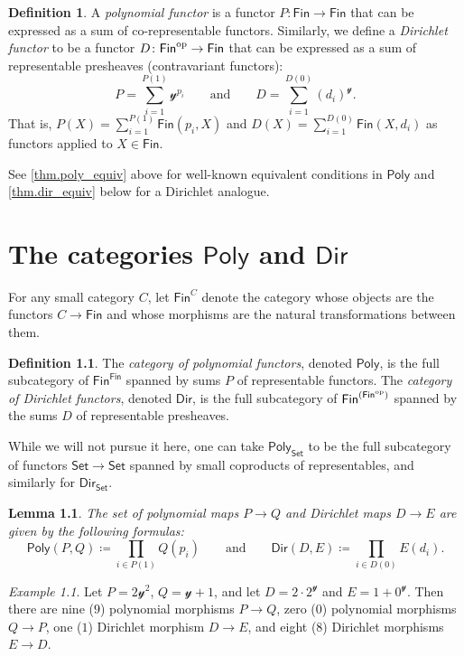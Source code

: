 \documentclass[11pt, article, one side]{memoir}
\theoremstyle{theorem}
\newtheorem{lemma}[section]{Lemma}
\theoremstyle{definition}
\newtheorem{definition}[section]{Definition}
\theoremstyle{remark}
\newtheorem{example}[section]{Example}
\newcommand{\Cat}[1]{\mathsf{#1}}%
\newcommand{\op}{^\tn{op}}
\newcommand{\tn}[1]{\textnormal{#1}}
\newcommand{\smset}{\Cat{Set}}
\newcommand{\fin}{\Cat{Fin}}
\newcommand{\yon}{\mathcal{y}}
\newcommand{\poly}{\Cat{Poly}}
\newcommand{\dir}{\Cat{Dir}}
\newcommand{\qqand}{\qquad\text{and}\qquad}
\begin{document}
\begin{definition}\label{def.poly_dir_obs}
A \emph{polynomial functor} is a functor $P\colon\fin\to\fin$ that can be expressed as a sum of co-representable functors. Similarly, we define a \emph{Dirichlet functor} to be a functor $D\colon\fin\op\to\fin$ that can be expressed as a sum of representable presheaves (contravariant functors):
\begin{equation}\label{eqn.finite_sum}
  P=\sum_{i=1}^{P(1)}\yon^{p_i}
  \qqand
  D=\sum_{i=1}^{D(0)}(d_i)^\yon.
\end{equation}
That is, $P(X)=\sum_{i=1}^{P(1)}\fin(p_i,X)$ and $D(X)=\sum_{i=1}^{D(0)}\fin(X,d_i)$ as functors applied to $X\in\fin$.
\end{definition}

See \cref{thm.poly_equiv} above for well-known equivalent conditions in $\poly$ and \cref{thm.dir_equiv} below for a Dirichlet analogue.

\chapter{The categories $\poly$ and $\dir$}

For any small category $C$, let $\fin^C$ denote the category whose objects are the functors $C\to\fin$ and whose morphisms are the natural transformations between them.
\begin{definition}\label{def.poly_dir}
The \emph{category of polynomial functors}, denoted $\poly$, is the full subcategory of $\fin^\fin$ spanned by sums $P$ of representable functors. The \emph{category of Dirichlet functors}, denoted $\dir$, is the full subcategory of $\fin^{(\fin\op)}$ spanned by the sums $D$ of representable presheaves.
\end{definition}

While we will not pursue it here, one can take $\poly_\smset$ to be the full subcategory of functors $\smset\to\smset$ spanned by small coproducts of representables, and similarly for $\dir_\smset$. 


\begin{lemma}\label{lemma.count_maps}
The set of polynomial maps $P\to Q$ and Dirichlet maps $D\to E$ are given by the following formulas:
\[
  \poly(P,Q)\coloneqq\prod_{i\in P(1)}Q(p_i)
  \qqand
  \dir(D,E)\coloneqq\prod_{i\in D(0)}E(d_i).
\]
\end{lemma}

\begin{example}
Let $P=2\yon^2$, $Q=\yon+1$, and let $D=2\cdot2^\yon$ and $E=1+0^\yon$. Then there are nine ($9$) polynomial morphisms $P\to Q$, zero ($0$) polynomial morphisms $Q\to P$, one ($1$) Dirichlet morphism $D\to E$, and eight ($8$) Dirichlet morphisms $E\to D$.
\end{example}
\end{document}
